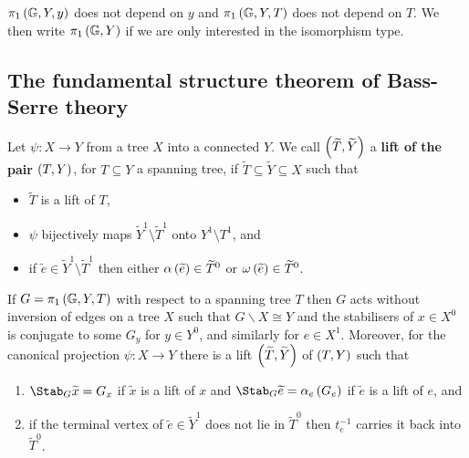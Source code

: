 \begin{corollary}
$ \pi_1\br{\GG, Y, y} $ does not depend on $ y $ and $ \pi_1\br{\GG, Y, T} $ does not depend on $ T $. We then write $ \pi_1\br{\GG, Y} $ if we are only interested in the isomorphism type.
\end{corollary}

\subsection{The fundamental structure theorem of Bass-Serre theory}

\begin{definition}
Let $ \psi : X \to Y $ from a tree $ X $ into a connected $ Y $. We call $ \br{\widetilde{T}, \widetilde{Y}} $ a \textbf{lift of the pair $ \br{T, Y} $}, for $ T \subseteq Y $ a spanning tree, if $ \widetilde{T} \subseteq \widetilde{Y} \subseteq X $ such that
\begin{itemize}
\item $ \widetilde{T} $ is a lift of $ T $,
\item $ \psi $ bijectively maps $ \widetilde{Y}^1 \setminus \widetilde{T}^1 $ onto $ Y^1 \setminus T^1 $, and
\item if $ \widetilde{e} \in \widetilde{Y}^1 \setminus \widetilde{T}^1 $ then either $ \alpha\br{\widetilde{e}} \in \widetilde{T}^0 $ or $ \omega\br{\widetilde{e}} \in \widetilde{T}^0 $.
\end{itemize}
\end{definition}

\begin{theorem}
\label{thm:2.7.2}
If $ G = \pi_1\br{\GG, Y, T} $ with respect to a spanning tree $ T $ then $ G $ acts without inversion of edges on a tree $ X $ such that $ G \backslash X \cong Y $ and the stabilisers of $ x \in X^0 $ is conjugate to some $ G_y $ for $ y \in Y^0 $, and similarly for $ e \in X^1 $. Moreover, for the canonical projection $ \psi : X \to Y $ there is a lift $ \br{\widetilde{T}, \widetilde{Y}} $ of $ \br{T, Y} $ such that
\begin{enumerate}
\item $ \Stab_G \widetilde{x} = G_x $ if $ \widetilde{x} $ is a lift of $ x $ and $ \Stab_G \widetilde{e} = \alpha_e\br{G_e} $ if $ \widetilde{e} $ is a lift of $ e $, and
\item if the terminal vertex of $ \widetilde{e} \in \widetilde{Y}^1 $ does not lie in $ \widetilde{T}^0 $ then $ t_e^{-1} $ carries it back into $ \widetilde{T}^0 $.
\end{enumerate}
\end{theorem}

